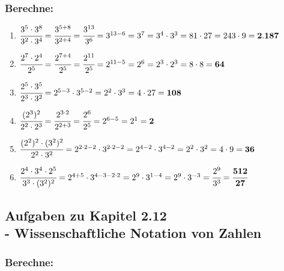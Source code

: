 \documentclass[a4paper,10pt]{article} %
\begin{document}
\subsubsection{Berechne:} %

\begin{enumerate}[label=\alph*)]

  \item \(\cfrac{3^5 \cdot 3^8}{3^2 \cdot 3^4} =
    \cfrac{3^{5 + 8}}{3^{2 + 4}} =
    \cfrac{3^{13}}{3^6} =
    3^{13 - 6} =
    3^7 =
    3^4 \cdot 3^3 =
    81 \cdot 27 =
    243 \cdot 9 =
    \mathbf{2.187}\) %

  \item \(\cfrac{2^7 \cdot 2^4}{2^5} =
    \cfrac{2^{7 + 4}}{2^5} =
    \cfrac{2^{11}}{2^5} =
    2^{11 - 5} =
    2^6 =
    2^3 \cdot 2^3 =
    8 \cdot 8 =
    \mathbf{64}\) %

  \item \(\cfrac{2^5 \cdot 3^5}{2^3 \cdot 3^2} =
    2^{5 - 3} \cdot 3^{5 - 2} =
    2^2 \cdot 3^3 =
    4 \cdot 27 =
    \mathbf{108}\) %

  \item \(\cfrac{(2^3)^2}{2^2 \cdot 2^3} =
    \cfrac{2^{3 \cdot 2}}{2^{2 + 3}} =
    \cfrac{2^6}{2^5} =
    2^{6 - 5} =
    2^1 =
    \mathbf{2}\) %

  \item \(\cfrac{(2^2)^2 \cdot (3^2)^2}{2^2 \cdot 3^2} =
    2^{2 \cdot 2 - 2} \cdot 3^{2 \cdot 2 - 2} =
    2^{4 - 2} \cdot 3^{4 - 2} =
    2^2 \cdot 3^2 =
    4 \cdot 9 =
    \mathbf{36}\) %

  \item \(\cfrac{2^4 \cdot 3^4 \cdot 2^5}{3^3 \cdot (3^2)^2} =
    2^{4 + 5} \cdot 3^{4 - 3 - 2 \cdot 2} =
    2^9 \cdot 3^{1 - 4} =
    2^9 \cdot 3^{-3} =
    \cfrac{2^9}{3^3} =
    \mathbf{\cfrac{512}{27}}\) %

\end{enumerate}

\subsection{Aufgaben zu Kapitel 2.12 \\
  - Wissenschaftliche Notation von Zahlen}

\subsubsection{Berechne:} %
\end{document}
